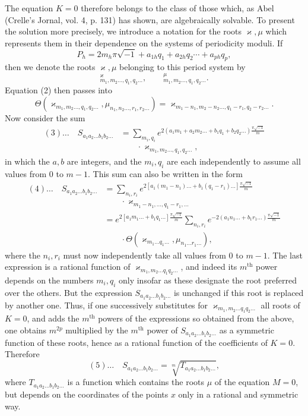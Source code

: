 \documentclass[10pt]{article}
\begin{document}
The equation \(K=0\) therefore belongs to the class of those which, as Abel (Crelle's Jornal, vol. 4, p. 131) has shown, are algebraically solvable. To present the solution more precisely, we introduce a notation for the roots \(\varkappa,\mu\) which represents them in their dependence on the systems of periodicity moduli. If
\[
P_h=2m_h\pi\sqrt{-1}+a_{1h}q_1+a_{2h}q_2\cdots+a_{ph}q_p,
\]
then we denote the roots \(\varkappa,\mu\) belonging to this period system by
\[
{}^{\varkappa}_{m_1,m_2\ldots,q_1,q_2\ldots},\qquad
{}^{\mu}_{m_1,m_2\ldots,q_1,q_2\ldots}.
\]
Equation (2) then passes into
\[
\Theta\!\left(
\varkappa_{m_1,m_2\ldots,q_1,q_2\ldots},
\mu_{n_1,n_2\ldots,r_1,r_2\ldots}
\right)
=
\varkappa_{m_1-n_1,m_2-n_2\ldots,q_1-r_1,q_2-r_2\ldots}.
\]
Now consider the sum
\[
\begin{aligned}
(3)\ldots\quad S_{a_1a_2\ldots b_1b_2\ldots}
&=\sum_{m_i,q_i}
e^{2(a_1m_1+a_2m_2\ldots+b_1q_1+b_2q_2\ldots)
\frac{\pi\sqrt{-1}}{m}}\\
&\qquad\cdot\varkappa_{m_1,m_2\ldots,q_1,q_2\ldots},
\end{aligned}
\]
in which the \(a,b\) are integers, and the \(m_i,q_i\) are each independently to assume all values from \(0\) to \(m-1\). This sum can also be written in the form
\[
\begin{aligned}
(4)\ldots\quad S_{a_1a_2\ldots b_1b_2\ldots}
&=\sum_{n_i,r_i}
e^{2\left[a_1(m_1-n_1)\ldots+b_1(q_1-r_1)\ldots\right]
\frac{\pi\sqrt{-1}}{m}}\\
&\qquad\cdot\varkappa_{m_1-n_1,\ldots,q_1-r_1,\ldots}\\
&=e^{2\left[a_1m_1\ldots+b_1q_1\ldots\right]\frac{\pi\sqrt{-1}}{m}}
\sum_{n_i,r_i}
e^{-2(a_1n_1\ldots+b_1r_1\ldots)\frac{\pi\sqrt{-1}}{m}}\\
&\qquad\cdot
\Theta\!\left(
\varkappa_{m_1\ldots q_1\ldots},
\mu_{n_1\ldots r_1\ldots}
\right),
\end{aligned}
\]
where the \(n_i,r_i\) must now independently take all values from \(0\) to \(m-1\). The last expression is a rational function of \(\varkappa_{m_1,m_2\ldots q_1q_2\ldots}\), and indeed its \(m^{\text{th}}\) power depends on the numbers \(m_i,q_i\) only insofar as these designate the root preferred over the others. But the expression \(S_{a_1a_2\ldots b_1b_2\ldots}\) is unchanged if this root is replaced by another one. Thus, if one successively substitutes for \(\varkappa_{m_1,m_2\ldots q_1q_2\ldots}\) all roots of \(K=0\), and adds the \(m^{\text{th}}\) powers of the expressions so obtained from the above, one obtains \(m^{2p}\) multiplied by the \(m^{\text{th}}\) power of \(S_{a_1a_2\ldots b_1b_2\ldots}\) as a symmetric function of these roots, hence as a rational function of the coefficients of \(K=0\). Therefore
\[
(5)\ldots\quad
S_{a_1a_2\ldots b_1b_2\ldots}
=
\sqrt[m]{T_{a_1a_2\ldots b_1b_2\ldots}},
\]
where \(T_{a_1a_2\ldots b_1b_2\ldots}\) is a function which contains the roots \(\mu\) of the equation \(M=0\), but depends on the coordinates of the points \(x\) only in a rational and symmetric way.
\end{document}
